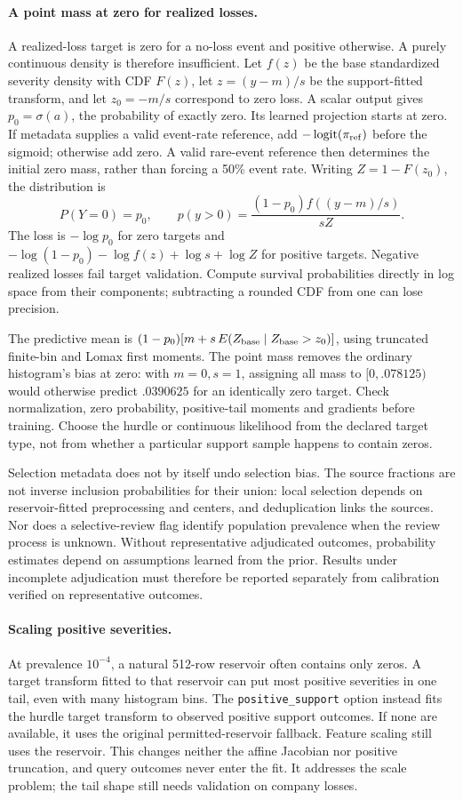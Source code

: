 \documentclass[11pt]{article}
\begin{document}
\paragraph{A point mass at zero for realized losses.} A realized-loss target is zero for a no-loss event and positive otherwise. A purely continuous density is therefore insufficient. Let $f(z)$ be the base standardized severity density with CDF $F(z)$, let $z=(y-m)/s$ be the support-fitted transform, and let $z_0=-m/s$ correspond to zero loss. A scalar output gives $p_0=\sigma(a)$, the probability of exactly zero. Its learned projection starts at zero. If metadata supplies a valid event-rate reference, add $-\operatorname{logit}(\pi_{\rm ref})$ before the sigmoid; otherwise add zero. A valid rare-event reference then determines the initial zero mass, rather than forcing a 50\% event rate. Writing $Z=1-F(z_0)$, the distribution is
\[
P(Y=0)=p_0,\qquad p(y>0)=\frac{(1-p_0)f((y-m)/s)}{sZ}.
\]
The loss is $-\log p_0$ for zero targets and $-\log(1-p_0)-\log f(z)+\log s+\log Z$ for positive targets. Negative realized losses fail target validation. Compute survival probabilities directly in log space from their components; subtracting a rounded CDF from one can lose precision.

The predictive mean is $(1-p_0)[m+s\,E(Z_{\rm base}\mid Z_{\rm base}>z_0)]$, using truncated finite-bin and Lomax first moments. The point mass removes the ordinary histogram's bias at zero: with $m=0,s=1$, assigning all mass to $[0,.078125)$ would otherwise predict $.0390625$ for an identically zero target. Check normalization, zero probability, positive-tail moments and gradients before training. Choose the hurdle or continuous likelihood from the declared target type, not from whether a particular support sample happens to contain zeros.

Selection metadata does not by itself undo selection bias. The source fractions are not inverse inclusion probabilities for their union: local selection depends on reservoir-fitted preprocessing and centers, and deduplication links the sources. Nor does a selective-review flag identify population prevalence when the review process is unknown. Without representative adjudicated outcomes, probability estimates depend on assumptions learned from the prior. Results under incomplete adjudication must therefore be reported separately from calibration verified on representative outcomes.


\paragraph{Scaling positive severities.} At prevalence $10^{-4}$, a natural 512-row reservoir often contains only zeros. A target transform fitted to that reservoir can put most positive severities in one tail, even with many histogram bins. The \texttt{positive\_support} option instead fits the hurdle target transform to observed positive support outcomes. If none are available, it uses the original permitted-reservoir fallback. Feature scaling still uses the reservoir. This changes neither the affine Jacobian nor positive truncation, and query outcomes never enter the fit. It addresses the scale problem; the tail shape still needs validation on company losses.
\end{document}

